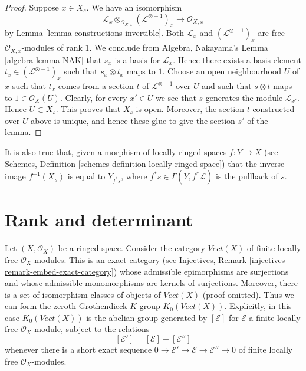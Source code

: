 \begin{proof}
Suppose $x \in X_s$.
We have an isomorphism
$$
\mathcal{L}_x \otimes_{\mathcal{O}_{X, x}} (\mathcal{L}^{\otimes -1})_x
\longrightarrow
\mathcal{O}_{X, x}
$$
by Lemma \ref{lemma-constructions-invertible}.
Both $\mathcal{L}_x$ and $(\mathcal{L}^{\otimes -1})_x$
are free $\mathcal{O}_{X, x}$-modules of rank $1$. We conclude
from Algebra, Nakayama's Lemma \ref{algebra-lemma-NAK} that
$s_x$ is a basis for $\mathcal{L}_x$. Hence there exists
a basis element $t_x \in (\mathcal{L}^{\otimes -1})_x$
such that $s_x \otimes t_x$ maps to $1$.
Choose an open neighbourhood $U$ of
$x$ such that $t_x$ comes from a section $t$
of $\mathcal{L}^{\otimes -1}$ over $U$ and such that
$s \otimes t$ maps to $1 \in \mathcal{O}_X(U)$.
Clearly, for every $x' \in U$ we see that $s$ generates
the module $\mathcal{L}_{x'}$. Hence $U \subset X_s$.
This proves that $X_s$ is open. Moreover, the section
$t$ constructed over $U$ above is unique, and hence
these glue to give the section $s'$ of the lemma.
\end{proof}

\noindent
It is also true that, given a morphism of locally ringed
spaces $f : Y \to X$
(see Schemes, Definition \ref{schemes-definition-locally-ringed-space})
that the inverse image $f^{-1}(X_s)$ is equal to $Y_{f^*s}$, where
$f^*s \in \Gamma(Y, f^*\mathcal{L})$ is the pullback of $s$.



\section{Rank and determinant}
\label{section-rank-and-det}

\noindent
Let $(X, \mathcal{O}_X)$ be a ringed space. Consider the category
$\textit{Vect}(X)$ of finite locally free $\mathcal{O}_X$-modules.
This is an exact category
(see Injectives, Remark \ref{injectives-remark-embed-exact-category})
whose admissible epimorphisms are
surjections and whose admissible monomorphisms are kernels of
surjections. Moreover, there is a set of isomorphism classes
of objects of $\textit{Vect}(X)$ (proof omitted). Thus we can form
the zeroth Grothendieck $K$-group $K_0(\textit{Vect}(X))$.
Explicitly, in this case $K_0(\textit{Vect}(X))$
is the abelian group generated by $[\mathcal{E}]$ for $\mathcal{E}$
a finite locally free $\mathcal{O}_X$-module, subject to the relations
$$
[\mathcal{E}'] = [\mathcal{E}] + [\mathcal{E}'']
$$
whenever there is a short exact sequence
$0 \to \mathcal{E}' \to \mathcal{E} \to \mathcal{E}'' \to 0$
of finite locally free $\mathcal{O}_X$-modules.

